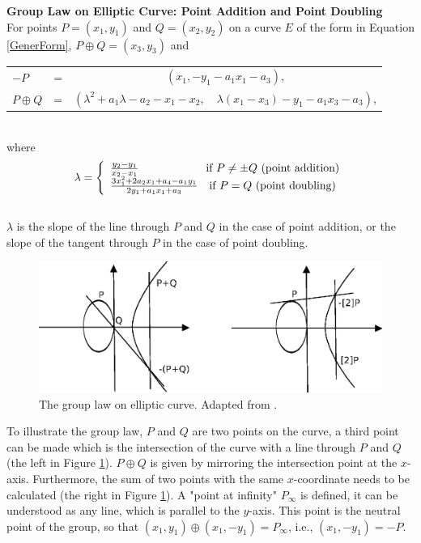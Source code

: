 \textbf{Group Law on Elliptic Curve: Point Addition and Point
  Doubling} \cite{Cohen}\\ For points $P=(x_1,y_1)$ and $Q=(x_2,y_2)$
on a curve $E$ of the form in Equation \ref{GenerForm}, $P\oplus
Q=(x_3,y_3)$ and\\
\begin{tabular}{llc}
\midrule \quad\quad $-P$ & = & $(x_1,-y_1-a_1x_1-a_3)$,\\ \quad\quad
$P\oplus Q$ & = & \quad\quad$(\lambda^2+a_1\lambda-a_2-x_1-x_2,\quad\lambda(x_1-x_3)-y_1-a_1x_3-a_3)$,\\ \bottomrule
\end{tabular}\\
where
\begin{equation*}
      \lambda =
      \left\{
       \begin{array}{ll}
       \frac{y_2-y_1}{x_2-x_1}\qquad\qquad\quad\quad \hbox{if $P\neq\pm Q$ (point addition)} \\
       \frac{3x_1^2+2a_2x_1+a_4-a_1y_1}{2y_1+a_1x_1+a_3}\quad\hbox{if $P=Q$ (point doubling)}
       \end{array}
      \right.
\end{equation*}\\
$\lambda$ is the slope of the line through $P$ and $Q$ in the case of
point addition, or the slope of the tangent through $P$ in the case of
point doubling.
\begin{figure}[h]
  \includegraphics[scale=1]{./images/Group_law_of_ECC}
  \caption{The group law on elliptic curve. Adapted from \cite{Cohen}.}\label{EC}
\end{figure}

To illustrate the group law, $P$ and $Q$ are two points on the curve,
a third point can be made which is the intersection of the curve with
a line through $P$ and $Q$ (the left in Figure \ref{EC}). $P\oplus Q$
is given by mirroring the intersection point at the
$x$-axis. Furthermore, the sum of two points with the same
$x$-coordinate needs to be calculated (the right in Figure
\ref{EC}). A "point at infinity" $P_\infty$ is defined, it can be
understood as any line, which is parallel to the $y$-axis. This point
is the neutral point of the group, so that
$(x_1,y_1)\oplus(x_1,-y_1)=P_\infty$, i.e., $(x_1,-y_1)=-P$.

